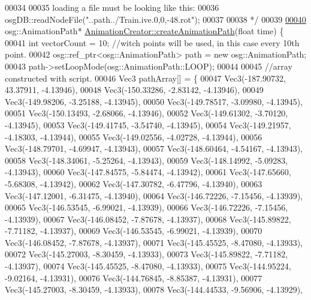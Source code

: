\begin{DoxyCode}
00034 \textcolor{comment}{}
00035 \textcolor{comment}{loading a file must be looking like this:}
00036 \textcolor{comment}{osgDB::readNodeFile("..path../Train.ive.0,0,-48.rot");}
00037 \textcolor{comment}{}
00038 \textcolor{comment}{*/}
00039 
\hypertarget{_animation_creater_8cpp_source_l00040}{}\hyperlink{class_animation_creator_aca52f3472d0be7043c63ff5ede8084aa}{00040} osg::AnimationPath* \hyperlink{class_animation_creator_aca52f3472d0be7043c63ff5ede8084aa}{AnimationCreator::createAnimationPath}(\textcolor{keywordtype}{float} time) 
      \{
00041     \textcolor{keywordtype}{int} vectorCount = 10; \textcolor{comment}{//witch points will be used, in this case every 10th point.}
00042     osg::ref\_ptr<osg::AnimationPath> path = \textcolor{keyword}{new} osg::AnimationPath;
00043     path->setLoopMode(osg::AnimationPath::LOOP);
00044 
00045     \textcolor{comment}{//array constructed with script.}
00046     Vec3 pathArray[] = \{
00047         Vec3(-187.90732, 43.37911, -4.13946),
00048         Vec3(-150.33286, -2.83142, -4.13946),
00049         Vec3(-149.98206, -3.25188, -4.13945),
00050         Vec3(-149.78517, -3.09980, -4.13945),
00051         Vec3(-150.13493, -2.68066, -4.13946),
00052         Vec3(-149.61302, -3.70120, -4.13945),
00053         Vec3(-149.41745, -3.54740, -4.13945),
00054         Vec3(-149.21957, -4.18303, -4.13944),
00055         Vec3(-149.02556, -4.02728, -4.13944),
00056         Vec3(-148.79701, -4.69947, -4.13943),
00057         Vec3(-148.60464, -4.54167, -4.13943),
00058         Vec3(-148.34061, -5.25264, -4.13943),
00059         Vec3(-148.14992, -5.09283, -4.13943),
00060         Vec3(-147.84575, -5.84474, -4.13942),
00061         Vec3(-147.65660, -5.68308, -4.13942),
00062         Vec3(-147.30782, -6.47796, -4.13940),
00063         Vec3(-147.12001, -6.31475, -4.13940),
00064         Vec3(-146.72226, -7.15456, -4.13939),
00065         Vec3(-146.53545, -6.99021, -4.13939),
00066         Vec3(-146.72226, -7.15456, -4.13939),
00067         Vec3(-146.08452, -7.87678, -4.13937),
00068         Vec3(-145.89822, -7.71182, -4.13937),
00069         Vec3(-146.53545, -6.99021, -4.13939),
00070         Vec3(-146.08452, -7.87678, -4.13937),
00071         Vec3(-145.45525, -8.47080, -4.13933),
00072         Vec3(-145.27003, -8.30459, -4.13933),
00073         Vec3(-145.89822, -7.71182, -4.13937),
00074         Vec3(-145.45525, -8.47080, -4.13933),
00075         Vec3(-144.95224, -9.02164, -4.13931),
00076         Vec3(-144.76845, -8.85387, -4.13931),
00077         Vec3(-145.27003, -8.30459, -4.13933),
00078         Vec3(-144.44533, -9.56906, -4.13929),

\end{DoxyCode}
